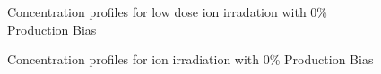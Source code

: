 \documentclass[a4paper]{article}
\begin{document}
\begin{figure}[h!]
        \caption{Concentration profiles for low dose ion irradation with 0\% Production Bias}
        \label{figure:concentrations_ion_0_1e-6}
      \end{figure}
      \begin{figure}[h!]  %
        \centering
        \qquad
        \caption{Concentration profiles for ion irradiation with 0\% Production Bias}
        \label{figure:concentrations_ion_0_1e-3}
      \end{figure}
\end{document}
